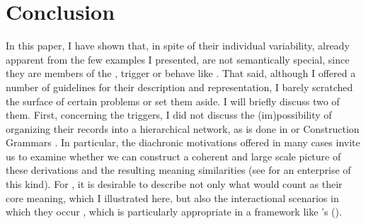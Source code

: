 \documentclass[output=paper,colorlinks,citecolor=brown]{langscibook}
\begin{document}
\section{Conclusion}
In this paper, I have shown that, in spite of their individual variability, already apparent from the few examples I presented,  are not semantically special, since they are members of the , trigger  or behave like . That said, although I offered a number of guidelines for their description and representation, I barely scratched the surface of certain problems or set them aside. I will briefly discuss two of them. First, concerning the  triggers, I did not discuss the (im)possibility of organizing their records into a hierarchical network, as is done in  \citep{HPSG:2021} or Construction Grammars \citep{Diessel:2023}. In particular, the diachronic motivations offered in many cases invite us to examine whether we can construct a coherent and large scale picture of these derivations and the resulting meaning similarities (see \citealt{Kortmann:1997} for an enterprise of this kind). For , it is desirable to describe not only what would count as their core meaning, which I illustrated here, but also the interactional scenarios in which they occur \citep{Aijmer:2002}, which is particularly appropriate in a framework like \citeauthor{Ginzburg:2012}'s (\citeyear{Ginzburg:2012}).


%
%
\end{document}
